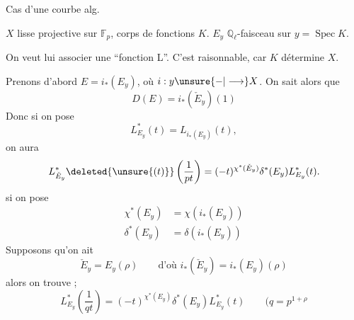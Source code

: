 Cas d'une courbe alg.

$X$  lisse projective  sur $\mathbb F_p$,  corps de fonctions $K$.
$E_y$ $\mathbb Q_\ell$-faisceau  sur $y=\operatorname{Spec}K$.

On veut lui associer une ``fonction L''. C'est raisonnable, car $K$ détermine $X$.

Prenons d'abord $E=i_*(E_y)$, où $i:y\unsure{-|\longrightarrow}X$.
On sait alors que
\[
D(E)=i_*(\check E_y)(1)
\]
 Donc si on pose
\[
L^*_{E_y}(t)=L_{i_*(E_y)}(t),
\]
on aura
\[
L^*_{\check E_y}\deleted{\unsure{(t)}}\left(\frac1{pt}\right)=(-t)^{\chi^*(\check E_y)}\delta^*(E_y)L^*_{E_y}(t).
\]
si on pose
\[
\begin{aligned}
\chi^*(E_y)&=\chi(i_*(E_y))\\
\delta^*(E_y)&=\delta(i_*(E_y))
\end{aligned}
\]
Supposons qu'on ait
\[
\check E_y=E_y(\rho)\qquad\text{d'où }i_*(\check E_y)=i_*(E_y)(\rho)
\]
alors on trouve ;
\[
\boxed{L^*_{E_y}\left(\frac1{qt}\right)=(-t)^{\chi^*(E_y)}\delta^*(E_y)L^*_{E_y}(t)}
\qquad(q=p^{1+\rho}
\]

